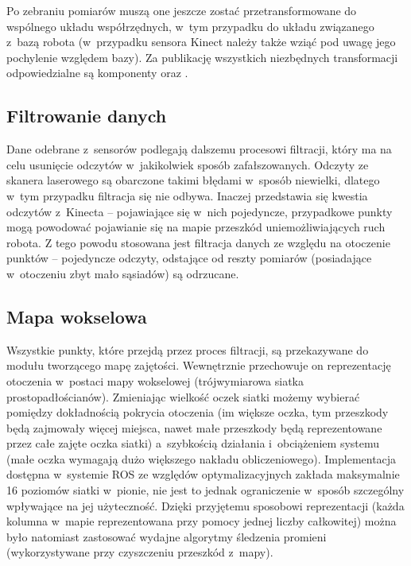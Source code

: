 Po zebraniu pomiarów muszą one jeszcze zostać przetransformowane do wspólnego
układu współrzędnych, w~tym przypadku do układu związanego z~bazą robota
(w~przypadku sensora Kinect należy także wziąć pod uwagę jego pochylenie względem
bazy). Za publikację wszystkich niezbędnych transformacji  odpowiedzialne są
komponenty  oraz .

\subsection{Filtrowanie danych}

Dane odebrane z~sensorów podlegają dalszemu procesowi filtracji, który ma na
celu usunięcie odczytów w~jakikolwiek sposób zafałszowanych. Odczyty ze skanera
laserowego są obarczone takimi błędami w~sposób niewielki, dlatego w~tym
przypadku filtracja się nie odbywa. Inaczej przedstawia się kwestia odczytów
z~Kinecta -- pojawiające się w~nich pojedyncze, przypadkowe punkty mogą powodować
pojawianie się na mapie przeszkód uniemożliwiających ruch robota. Z tego powodu
stosowana jest filtracja danych ze względu na otoczenie punktów -- pojedyncze
odczyty, odstające od reszty pomiarów (posiadające w~otoczeniu zbyt mało
sąsiadów) są odrzucane.

\subsection{Mapa wokselowa}

Wszystkie punkty, które przejdą przez proces filtracji, są przekazywane do
modułu tworzącego mapę zajętości. Wewnętrznie przechowuje on reprezentację
otoczenia w~postaci mapy wokselowej (trójwymiarowa siatka prostopadłościanów).
Zmieniając wielkość oczek siatki możemy wybierać pomiędzy dokładnością pokrycia
otoczenia (im większe oczka, tym przeszkody będą zajmowały więcej miejsca, nawet małe
przeszkody będą reprezentowane przez całe zajęte oczka siatki) a~szybkością
działania i~obciążeniem systemu (małe oczka wymagają dużo większego nakładu
obliczeniowego). Implementacja dostępna w~systemie ROS ze względów
optymalizacyjnych zakłada maksymalnie 16 poziomów siatki w~pionie, nie jest to
jednak ograniczenie w~sposób szczególny wpływające na jej użyteczność. Dzięki
przyjętemu sposobowi reprezentacji (każda kolumna w~mapie reprezentowana przy
pomocy jednej liczby całkowitej) można było natomiast zastosować wydajne
algorytmy śledzenia promieni (wykorzystywane przy czyszczeniu przeszkód z~mapy).

